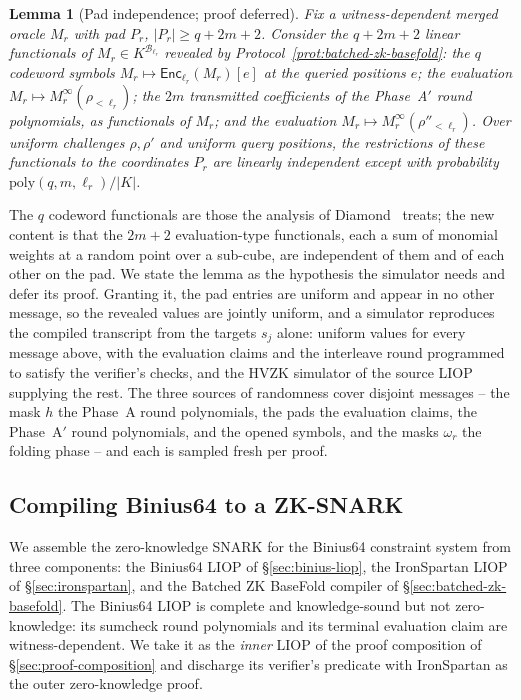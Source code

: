 \documentclass{article}
\newtheorem{lemma}[theorem]{Lemma}
\theoremstyle{definition}
\newcommand{\BB}{\mathcal{B}}
\begin{document}
\begin{lemma}[Pad independence; proof deferred]
\label{lem:pad-independence}
Fix a witness-dependent merged oracle $M_r$ with pad $P_r$, $|P_r| \ge q + 2m + 2$. Consider the $q + 2m + 2$ linear functionals of $M_r \in K^{\BB_{\ell_r}}$ revealed by Protocol~\ref{prot:batched-zk-basefold}: the $q$ codeword symbols $M_r \mapsto \textsf{Enc}_{\ell_r}(M_r)[e]$ at the queried positions $e$; the evaluation $M_r \mapsto M_r^\infty(\rho_{< \ell_r})$; the $2m$ transmitted coefficients of the Phase~A$'$ round polynomials, as functionals of $M_r$; and the evaluation $M_r \mapsto M_r^\infty(\rho''_{< \ell_r})$. Over uniform challenges $\rho, \rho'$ and uniform query positions, the restrictions of these functionals to the coordinates $P_r$ are linearly independent except with probability $\text{poly}(q, m, \ell_r) / |K|$.
\end{lemma}

The $q$ codeword functionals are those the analysis of Diamond~\cite{Diamond:2025ac} treats; the new content is that the $2m + 2$ evaluation-type functionals, each a sum of monomial weights at a random point over a sub-cube, are independent of them and of each other on the pad. We state the lemma as the hypothesis the simulator needs and defer its proof. Granting it, the pad entries are uniform and appear in no other message, so the revealed values are jointly uniform, and a simulator reproduces the compiled transcript from the targets $s_j$ alone: uniform values for every message above, with the evaluation claims and the interleave round programmed to satisfy the verifier's checks, and the HVZK simulator of the source LIOP supplying the rest. The three sources of randomness cover disjoint messages -- the mask $h$ the Phase~A round polynomials, the pads the evaluation claims, the Phase~A$'$ round polynomials, and the opened symbols, and the masks $\omega_r$ the folding phase -- and each is sampled fresh per proof.

\subsection{Compiling Binius64 to a ZK-SNARK}
\label{sec:binius-zk-snark}

We assemble the zero-knowledge SNARK for the Binius64 constraint system from three components: the Binius64 LIOP of \S\ref{sec:binius-liop}, the IronSpartan LIOP of \S\ref{sec:ironspartan}, and the Batched ZK BaseFold compiler of \S\ref{sec:batched-zk-basefold}. The Binius64 LIOP is complete and knowledge-sound but not zero-knowledge: its sumcheck round polynomials and its terminal evaluation claim are witness-dependent. We take it as the \emph{inner} LIOP of the proof composition of \S\ref{sec:proof-composition} and discharge its verifier's predicate with IronSpartan as the outer zero-knowledge proof.
\end{document}
